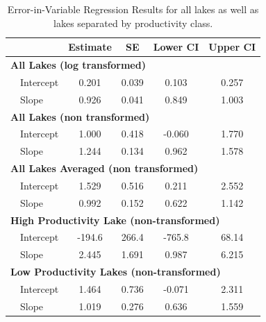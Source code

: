 \documentclass[12pt, oneside]{article}
\begin{document}
\newpage
\begin{table}[h]
\centering
\begin{threeparttable}
\caption{Error-in-Variable Regression Results for all lakes as well as lakes separated by productivity class.}
\label{tab:table2}
\begin{tabular}{@{}llcccc@{}}
\toprule
            &    & Estimate  & SE    & Lower CI  & Upper CI  \\ \midrule
\multicolumn{6}{l}{\bf{All Lakes (log transformed)}} \\
& Intercept       & 0.201     & 0.039 & 0.103    & 0.257  \\
& Slope           & 0.926     & 0.041 & 0.849     & 1.003 \\
\multicolumn{6}{l}{\bf{All Lakes (non transformed)}} \\
& Intercept       & 1.000     & 0.418 & -0.060    & 1.770  \\
& Slope           & 1.244     & 0.134 & 0.962     & 1.578 \\
\multicolumn{6}{l}{\bf{All Lakes Averaged (non transformed)}} \\
& Intercept       & 1.529     & 0.516 & 0.211    & 2.552  \\
& Slope           & 0.992     & 0.152 & 0.622     & 1.142 \\
\multicolumn{6}{l}{\bf{High Productivity Lake (non-transformed)}} \\
& Intercept       & -194.6     & 266.4 & -765.8    & 68.14  \\
& Slope           & 2.445     & 1.691 & 0.987     & 6.215 \\
\multicolumn{6}{l}{\bf{Low Productivity Lakes (non-transformed)}} \\
& Intercept       & 1.464     & 0.736 & -0.071    & 2.311  \\
& Slope           & 1.019     & 0.276 & 0.636     & 1.559 \\
 \bottomrule
\end{tabular}
\end{threeparttable}
\end{table} %
\end{document}

